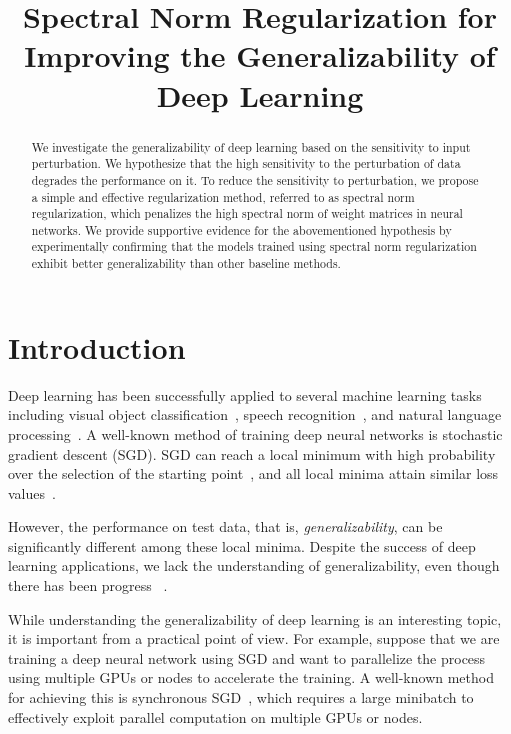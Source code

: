 \title{Spectral Norm Regularization for Improving the Generalizability of Deep Learning}

\begin{abstract}
We investigate the generalizability of deep learning based on the sensitivity to input perturbation. We hypothesize that the high sensitivity to the perturbation of data degrades the performance on it. To reduce the sensitivity to perturbation, we propose a simple and effective regularization method, referred to as spectral norm regularization, which penalizes the high spectral norm of weight matrices in neural networks. We provide supportive evidence for the abovementioned hypothesis by experimentally confirming that the models trained using spectral norm regularization exhibit better generalizability than other baseline methods.
\end{abstract}

\section{Introduction}

Deep learning has been successfully applied to several machine learning tasks including visual object classification~\cite{he2016identity,Krizhevsky:2012wl}, speech recognition~\cite{Hinton:2012is}, and natural language processing~\cite{Collobert:2008kg, jozefowicz2016exploring}. A well-known method of training deep neural networks is stochastic gradient descent (SGD). SGD can reach a local minimum with high probability over the selection of the starting point~\cite{Lee:2016vd}, and all local minima attain similar loss values~\cite{Choromanska:2015ui,Dauphin:2014tn,Kawaguchi:2016ub}.

However, the performance on test data, that is, \emph{generalizability}, can be significantly different among these local minima. Despite the success of deep learning applications, we lack the understanding of generalizability, even though there has been progress ~\cite{Keskar:2017tz,Zhang:2017te}.

While understanding the generalizability of deep learning is an interesting topic, it is important from a practical point of view. For example, suppose that we are training a deep neural network using SGD and want to parallelize the process using multiple GPUs or nodes to accelerate the training. A well-known method for achieving this is synchronous SGD~\cite{das2016distributed, chen2016revisiting}, which requires a large minibatch to effectively exploit parallel computation on multiple GPUs or nodes.

